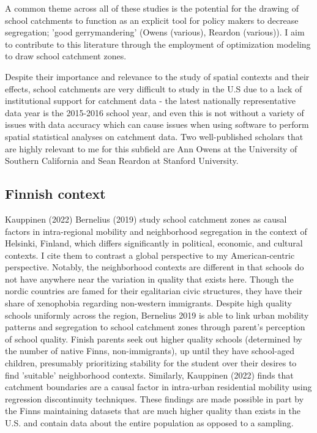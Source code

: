 A common theme across all of these studies is the potential for the
drawing of school catchments to function as an explicit tool for
policy makers to decrease segregation; 'good gerrymandering' (Owens
(various), Reardon (various)). I aim to contribute to this literature
through the employment of optimization modeling to draw school
catchment zones.

Despite their importance and relevance to the study of spatial
contexts and their effects, school catchments are very difficult to
study in the U.S due to a lack of institutional support for catchment
data - the latest nationally representative data year is the 2015-2016
school year, and even this is not without a variety of issues with
data accuracy which can cause issues when using software to perform
spatial statistical analyses on catchment data. Two well-published
scholars that are highly relevant to me for this subfield are Ann
Owens at the University of Southern California and Sean Reardon at Stanford University.

\subsection{Finnish context}
Kauppinen (2022) Bernelius (2019) study school catchment zones as
causal factors in intra-regional mobility and neighborhood segregation
in the context of Helsinki, Finland, which differs significantly in
political, economic, and cultural contexts. I cite them to contrast a
global perspective to my American-centric perspective. Notably, the
neighborhood contexts are different in that schools do not have
anywhere near the variation in quality that exists here. Though the
nordic countries are famed for their egalitarian civic structures,
they have their share of xenophobia regarding non-western
immigrants. Despite high quality schools uniformly across the region,
Bernelius 2019 is able to link urban mobility patterns and segregation
to school catchment zones through parent's perception of school
quality. Finish parents seek out higher quality schools (determined by
the number of native Finns, non-immigrants), up until they have
school-aged children, presumably prioritizing stability for the
student over their desires to find 'suitable' neighborhood
contexts. Similarly, Kauppinen (2022) finds that catchment boundaries
are a causal factor in intra-urban residential mobility using
regression discontinuity techniques. These findings are made possible
in part by the Finns maintaining datasets that are much higher quality
than exists in the U.S. and contain data about the entire population
as opposed to a sampling.
